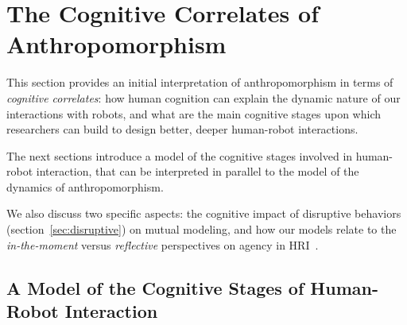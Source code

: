 \documentclass{frontiersSCNS} %
\begin{document}
%
%
%
%
%
%

\section{The Cognitive Correlates of Anthropomorphism}
\label{sec:cognition-neuroscience}

This section provides an initial interpretation of anthropomorphism in
terms of \emph{cognitive correlates}: how human cognition can explain the
dynamic nature of our interactions with robots, and what are the main cognitive
stages upon which researchers can build to design better, deeper human-robot
interactions.

The next sections introduce a model of the cognitive stages involved in
human-robot interaction, that can be interpreted in parallel to the model of the
dynamics of anthropomorphism.

We also discuss two specific aspects: the cognitive impact of disruptive
behaviors (section~\ref{sec:disruptive}) on mutual modeling, and how our models
relate to the \emph{in-the-moment} versus \emph{reflective} perspectives on
agency in HRI~\citep{takayama_perspectives_2012}.


\subsection{A Model of the Cognitive Stages of Human-Robot Interaction}
\label{sec:cognitive-model}
\end{document}
